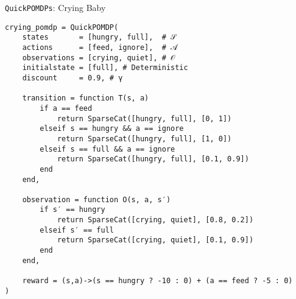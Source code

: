 
\begin{frame}[fragile]{\texttt{QuickPOMDPs}: Crying Baby}

\begin{lrbox}{\cryingbabycode}%
\begin{lstlisting}[language=JuliaLocal, style=julia]
crying_pomdp = QuickPOMDP(
    states       = [hungry, full],  # 𝒮
    actions      = [feed, ignore],  # 𝒜
    observations = [crying, quiet], # 𝒪
    initialstate = [full], # Deterministic
    discount     = 0.9, # γ

    transition = function T(s, a)
        if a == feed
            return SparseCat([hungry, full], [0, 1])
        elseif s == hungry && a == ignore
            return SparseCat([hungry, full], [1, 0])
        elseif s == full && a == ignore
            return SparseCat([hungry, full], [0.1, 0.9])
        end
    end,

    observation = function O(s, a, s′)
        if s′ == hungry
            return SparseCat([crying, quiet], [0.8, 0.2])
        elseif s′ == full
            return SparseCat([crying, quiet], [0.1, 0.9])
        end
    end,
    
    reward = (s,a)->(s == hungry ? -10 : 0) + (a == feed ? -5 : 0)
) 
\end{lstlisting}
\end{lrbox}%

\scalebox{0.3}{\usebox{\cryingbabycode}}

\end{frame}


